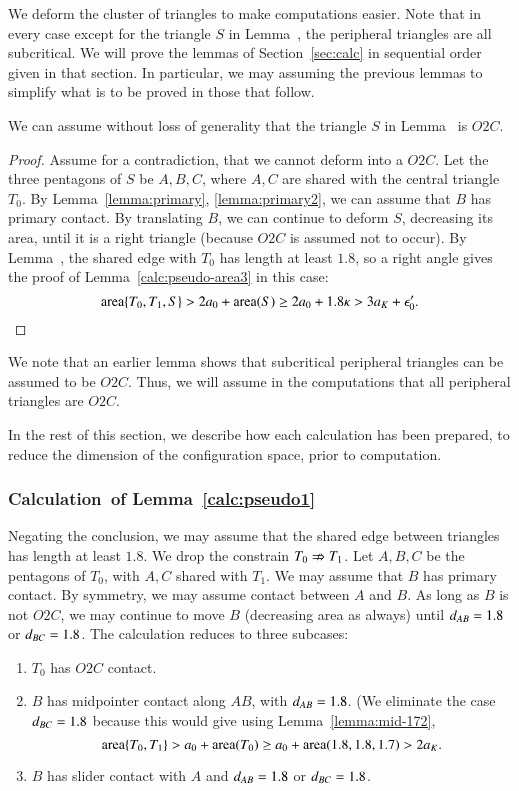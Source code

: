We deform the cluster of triangles to make computations easier.  Note that in every case except for the
triangle $S$ in Lemma~, the peripheral triangles are all subcritical.  We will prove
the lemmas of Section~\ref{sec:calc} in sequential order given in that section.  
In particular, we may  assuming the previous
lemmas to simplify what is to be proved in those that follow.

\begin{lemma}  We can assume without loss of generality that the triangle $S$ in Lemma~
is $O2C$.
\end{lemma}

\begin{proof} Assume for a contradiction, that we cannot deform into a $O2C$.  Let the three pentagons of $S$
be $A,B,C$, where $A,C$ are shared with the central triangle $T_0$.  By Lemma~\ref{lemma:primary}, \ref{lemma:primary2},
we can assume that $B$ has primary contact.  By translating $B$, we can continue to deform $S$, decreasing its area,
until it is a right triangle (because $O2C$ is assumed not to occur).  By Lemma~, the shared edge
with $T_0$ has length at least $1.8$, so a right angle gives the proof of Lemma~\ref{calc:pseudo-area3} in this case:
\[
{\operatorname{area}}\{T_0,T_1,S\} > 2a_0 + {\operatorname{area}}(S) \ge 2a_0 + 1.8\kappa > 3a_K + \epsilon_0'.
\]
\end{proof}


We note that an earlier lemma shows that subcritical peripheral triangles can be assumed to be $O2C$. Thus,
we will assume in the computations that all peripheral triangles are $O2C$.

In the rest of this section, we describe how each  calculation has been prepared, to reduce the dimension
of the configuration space, prior to computation.

\subsubsection{Calculation~of Lemma~\ref{calc:pseudo1}} 
Negating the conclusion, we may assume that the shared edge between triangles has length at least $1.8$.  We drop the constrain $T_0\nRightarrow T_1$.
Let $A,B,C$ be the pentagons of $T_0$, with $A,C$ shared with $T_1$. We may assume that $B$ has primary contact. By symmetry, we may assume
contact between $A$ and $B$.  As long as $B$ is not  $O2C$, we may continue to move $B$ (decreasing area as always) until $d_{AB}=1.8$ or $d_{BC}=1.8$.
The calculation reduces to three subcases:
\begin{enumerate}
\item $T_0$ has $O2C$ contact.
\item $B$ has midpointer contact along $AB$, with $d_{AB}=1.8$.  (We eliminate the case $d_{BC}=1.8$ because this
would give using Lemma~\ref{lemma:mid-172},
\[
{\operatorname{area}}\{T_0,T_1\} > a_0 + {\operatorname{area}}(T_0) \ge a_0 + {\operatorname{area}}(1.8,1.8,1.7) > 2a_K.
\]
\item $B$ has slider contact with $A$ and $d_{AB}=1.8$ or $d_{BC}=1.8$.
\end{enumerate}

